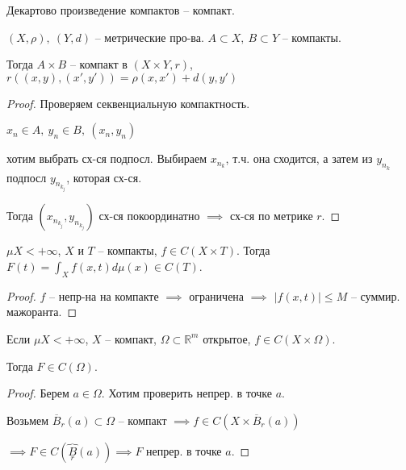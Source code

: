 \begin{lemma}
    Декартово произведение компактов -- компакт.

    $(X, \rho), \ (Y, d)$ -- метрические про-ва. $A \subset X, \ B \subset Y$ -- компакты.

    Тогда $A \times B$ -- компакт в $(X \times Y, r)$, $r\left((x, y), (x', y')\right) = \rho(x, x') + d(y, y')$
\end{lemma}
\begin{proof}
    Проверяем секвенциальную компактность.

    $x_n \in A, \ y_n \in B, \ (x_n, y_n)$

    хотим выбрать сх-ся подпосл. Выбираем $x_{n_k}$, т.ч. она сходится, а затем из $y_{n_k}$ подпосл $y_{n_{k_j}}$, которая сх-ся.

    Тогда $(x_{n_{k_j}}, y_{n_{k_j}})$ сх-ся покоординатно $\implies$ сх-ся по метрике $r$.
\end{proof}

\begin{theorem}
    $\mu X < +\infty$, $X$ и $T$ -- компакты, $f \in C(X \times T)$. Тогда $F(t) = \int_{X} {f(x, t)d \mu(x)} \in C(T)$. 
\end{theorem}
\begin{proof}
    $f$ -- непр-на на компакте $\implies$ ограничена $\implies$ $| f(x, t) | \leq M$ -- суммир. мажоранта.
\end{proof}
\begin{consequence}
    Если $\mu X < +\infty$, $X$ -- компакт, $\Omega \subset \mathbb{R}^m$ открытое, $f \in C(X \times \Omega)$.

    Тогда $F \in C(\Omega)$.
\end{consequence}
\begin{proof}
    Берем $a \in \Omega$. Хотим проверить непрер. в точке $a$.

    Возьмем $\overline{B}_r(a) \subset \Omega$ -- компакт $\implies f \in C(X \times \overline{B}_r(a))$


    $\implies F \in C(\overbrace{B}_r(a)) \implies F$ непрер. в точке $a$.
\end{proof}

